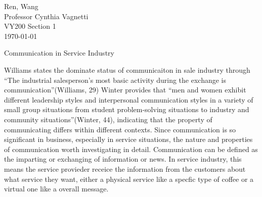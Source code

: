 \documentclass[12pt]{article}
\begin{document}
\begin{flushleft}

Ren, Wang\\
Professor Cynthia Vagnetti \\
VY200 Section 1\\
\today\\


\begin{center}
  Communication in Service Industry
\end{center}


\setlength{\parindent}{0.5in}
Williams states the dominate status of communicaiton in sale industry through
``The industrial salesperson's most basic activity during the exchange is
communication''(Williams, 29) Winter provides that ``men and women exhibit
different leadership styles and interpersonal communication styles in a variety
of small group situations from student problem-solving situations to industry
and community situations''(Winter, 44), indicating that the property of communicating
differs within different contexts.
Since communication is so significant in business, especially in service
situations, the nature and  properties of communication worth investigating in detail.
Communication can be defined as the imparting or exchanging of information or news.
In service industry, this means the service provieder receice the information
from the customers about what service they want, either a physical service like
a specfic type of coffee or a virtual one like a overall message. 






\end{flushleft}
\end{document}
